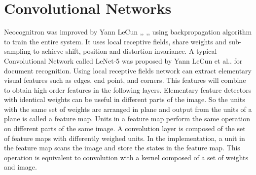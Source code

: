 \documentclass{article}
\begin{document}
\section{Convolutional Networks}
\par Neocognitron was improved by  Yann LeCun \cite{lecun-86},\cite{lecun-89d}, \cite{lecun-89e},\cite{lecun-90c}, \cite{lecun-90e} using backpropagation algorithm\cite{BRYSON1963} to train the entire system.
It uses  local receptive fields, share weights and  sub-sampling to achieve  shift, position and distortion invariance. A typical Convolutional Network called  LeNet-5 was proposed by   Yann LeCun et al..\cite{LeCun1998}  for document recognition. Using local receptive fields network can extract elementary visual features such as edges, end point, and corners. This features will combine to obtain high order features in the following layers.  Elementary feature detectors with identical weights can be useful in different parts of the image. So the units with  the same set of weights are arranged in plane and output from  the units of a plane is called  a feature map. Units in  a feature map perform the same operation on different parts of the same image. A convolution layer is composed of the set of feature maps with differently weighed units. In the implementation, a unit in the feature map scans the image and store the states in the feature map. This operation is equivalent to convolution with a kernel composed of a  set of weights and image. 
\end{document}
